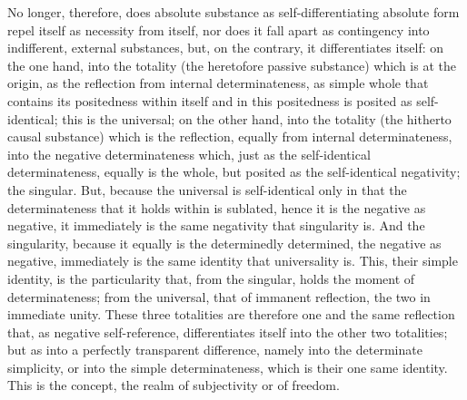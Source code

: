 No longer, therefore, does absolute substance
as self-differentiating absolute form
repel itself as necessity from itself,
nor does it fall apart as contingency
into indifferent, external substances,
but, on the contrary, it differentiates itself:
on the one hand, into the totality
(the heretofore passive substance)
which is at the origin, as the reflection from internal determinateness,
as simple whole that contains its positedness within itself
and in this positedness is posited as self-identical;
this is the universal;
on the other hand, into the totality
(the hitherto causal substance)
which is the reflection, equally from internal determinateness,
into the negative determinateness
which, just as the self-identical determinateness, equally is the whole,
but posited as the self-identical negativity;
the singular.
But, because the universal is self-identical only in that
the determinateness that it holds within is sublated,
hence it is the negative as negative,
it immediately is the same negativity that singularity is.
And the singularity, because it equally is
the determinedly determined, the negative as negative,
immediately is the same identity that universality is.
This, their simple identity, is the particularity that,
from the singular, holds the moment of determinateness;
from the universal, that of immanent reflection,
the two in immediate unity.
These three totalities are therefore one and the same reflection
that, as negative self-reference, differentiates itself
into the other two totalities;
but as into a perfectly transparent difference,
namely into the determinate simplicity,
or into the simple determinateness,
which is their one same identity.
This is the concept,
the realm of subjectivity or of freedom.
